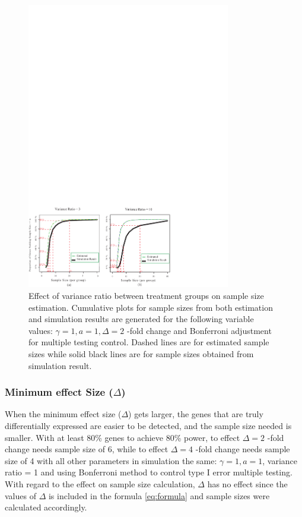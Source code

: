 \documentclass{bioinfo}
\begin{document}
\begin{figure}[h]
  \centerline{\includegraphics*[width=3.5in]{ResVarF.pdf}}
  \caption[Effect of variance ratio between treatment groups on sample size estimation]
  {Effect of variance ratio between treatment groups on sample size estimation.
    Cumulative plots for sample sizes from both estimation and simulation
    results are generated for the following variable values: $\gamma = 1, a = 1, \Delta = 2$ -fold change
    and Bonferroni adjustment for multiple testing control. Dashed lines are for estimated sample sizes
    while solid black lines are for sample sizes obtained from simulation result.}
  \label{fig:ResVar}
\end{figure}

\subsubsection{Minimum effect Size ($\Delta$)}

When the minimum effect size ($\Delta$) gets larger, the genes that are truly differentially expressed are easier to be
detected, and the sample size needed is smaller.  With at least 80\% genes to achieve 80\% power, to effect $\Delta = 2$ -fold
change needs sample size of 6, while to effect $\Delta = 4$ -fold change needs sample size of 4 with all other parameters in
simulation the same: $\gamma = 1, a = 1$, variance ratio = 1 and using Bonferroni method to control type I error multiple
testing. With regard to the effect on sample size calculation, $\Delta$ has no effect since the values of $\Delta$ is included
in the formula \ref{eq:formula} and sample sizes were calculated accordingly.
\end{document}
